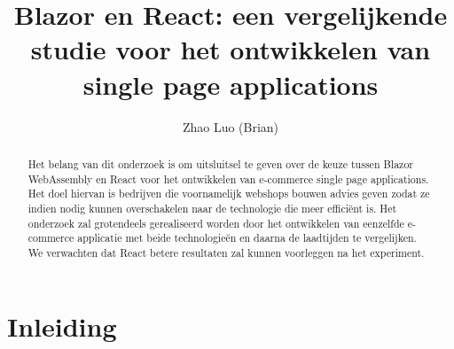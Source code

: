 \documentclass{hogent-article}
\title{Blazor en React: een vergelijkende studie voor het ontwikkelen van single page applications}
\author{Zhao Luo (Brian)}
\begin{document}
\begin{abstract}
  Het belang van dit onderzoek is om uitsluitsel te geven over de keuze tussen Blazor WebAssembly en React voor het ontwikkelen van e-commerce single page applications. Het doel hiervan is bedrijven die voornamelijk webshops bouwen advies geven zodat ze indien nodig kunnen overschakelen naar de technologie die meer efficiënt is. Het onderzoek zal grotendeels gerealiseerd worden door het ontwikkelen van eenzelfde e-commerce applicatie met beide technologieën en daarna de laadtijden te vergelijken. We verwachten dat React betere resultaten zal kunnen voorleggen na het experiment.
\end{abstract}

\tableofcontents

\bigskip





\section{Inleiding}%
\label{sec:inleiding}

\end{document}
